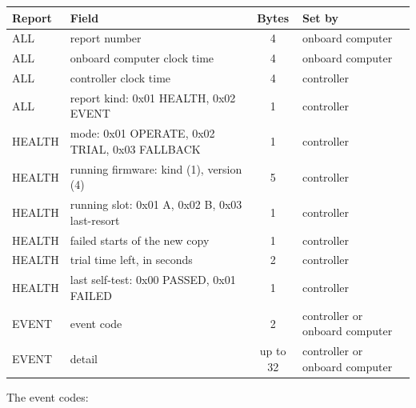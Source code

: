 \documentclass[11pt,a4paper]{article}
\begin{document}
{\footnotesize
\begin{xltabular}{\textwidth}{@{}l>{\raggedright\arraybackslash}Xcl@{}}
\toprule
Report & Field & Bytes & Set by \\
\midrule
\endhead
ALL & report number & 4 & onboard computer \\
ALL & onboard computer clock time & 4 & onboard computer \\
ALL & controller clock time & 4 & controller \\
ALL & report kind: 0x01 HEALTH, 0x02 EVENT & 1 & controller \\
HEALTH & mode: 0x01 OPERATE, 0x02 TRIAL, 0x03 FALLBACK & 1 & controller \\
HEALTH & running firmware: kind (1), version (4) & 5 & controller \\
HEALTH & running slot: 0x01 A, 0x02 B, 0x03 last-resort & 1 & controller \\
HEALTH & failed starts of the new copy & 1 & controller \\
HEALTH & trial time left, in seconds & 2 & controller \\
HEALTH & last self-test: 0x00 PASSED, 0x01 FAILED & 1 & controller \\
EVENT & event code & 2 & controller or onboard computer \\
EVENT & detail & up to 32 & controller or onboard computer \\
\bottomrule
\end{xltabular}}

\vspace{-0.8em}

\medskip
\noindent The event codes:
\end{document}
